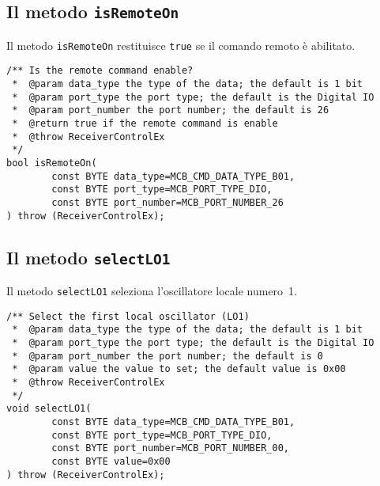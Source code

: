 \subsection{Il metodo \texttt{isRemoteOn}}
Il metodo \texttt{isRemoteOn} restituisce \texttt{true} se il comando remoto \`e abilitato.
\lstset{language=C++}
\begin{lstlisting}[caption={Dichiarazione del metodo \texttt{isRemoteOn}},
label=lst:isRemoteOn,mathescape]
/** Is the remote command enable?
 *  @param data_type the type of the data; the default is 1 bit
 *  @param port_type the port type; the default is the Digital IO
 *  @param port_number the port number; the default is 26
 *  @return true if the remote command is enable
 *  @throw ReceiverControlEx
 */
bool isRemoteOn(
        const BYTE data_type=MCB_CMD_DATA_TYPE_B01,
        const BYTE port_type=MCB_PORT_TYPE_DIO,
        const BYTE port_number=MCB_PORT_NUMBER_26
) throw (ReceiverControlEx);
\end{lstlisting}
\lstset{numbers=none}


\subsection{Il metodo \texttt{selectLO1}}
Il metodo \texttt{selectLO1} seleziona l'oscillatore locale numero~1.
\lstset{language=C++}
\begin{lstlisting}[caption={Dichiarazione del metodo \texttt{selectLO1}},
label=lst:selectLO1,mathescape]
/** Select the first local oscillator (LO1)
 *  @param data_type the type of the data; the default is 1 bit
 *  @param port_type the port type; the default is the Digital IO
 *  @param port_number the port number; the default is 0
 *  @param value the value to set; the default value is 0x00
 *  @throw ReceiverControlEx
 */
void selectLO1(
        const BYTE data_type=MCB_CMD_DATA_TYPE_B01,
        const BYTE port_type=MCB_PORT_TYPE_DIO,
        const BYTE port_number=MCB_PORT_NUMBER_00,
        const BYTE value=0x00
) throw (ReceiverControlEx);
\end{lstlisting}
\lstset{numbers=none}



